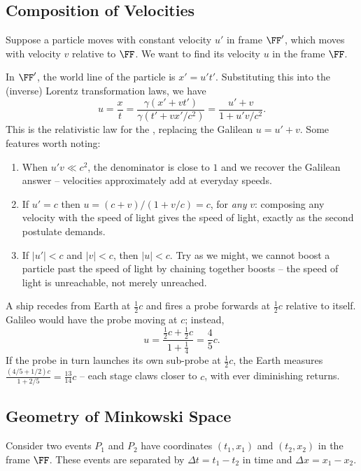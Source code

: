 \subsection{Composition of Velocities}

Suppose a particle moves with constant velocity $u'$ in frame $\FF'$, which moves with velocity $v$ relative to $\FF$. We want to find its velocity $u$ in the frame $\FF$.

In $\FF'$, the world line of the particle is $x' = u't'$. Substituting this into the (inverse) Lorentz transformation laws, we have
$$
u = \frac{x}{t} = \frac{\gamma(x' + vt')}{\gamma(t' + vx'/c^2)} = \frac{u' + v}{1 + u' v/c^2}.
$$
This is the relativistic law for the , replacing the Galilean $u = u' + v$. Some features worth noting:
\begin{enumerate}[label=(\roman*)]
	\item When $u'v \ll c^2$, the denominator is close to $1$ and we recover the Galilean answer -- velocities approximately add at everyday speeds.
	\item If $u' = c$ then $u = (c + v)/(1 + v/c) = c$, for \emph{any} $v$: composing any velocity with the speed of light gives the speed of light, exactly as the second postulate demands.
	\item If $|u'| < c$ and $|v| < c$, then $|u| < c$. Try as we might, we cannot boost a particle past the speed of light by chaining together boosts -- the speed of light is unreachable, not merely unreached.
\end{enumerate}

\begin{example}
	A ship recedes from Earth at $\frac{1}{2}c$ and fires a probe forwards at $\frac{1}{2}c$ relative to itself. Galileo would have the probe moving at $c$; instead,
	$$
	u = \frac{\frac{1}{2}c + \frac{1}{2}c}{1 + \frac{1}{4}} = \frac{4}{5}c.
	$$
	If the probe in turn launches its own sub-probe at $\frac{1}{2}c$, the Earth measures $\frac{(4/5 + 1/2)c}{1 + 2/5} = \frac{13}{14}c$ -- each stage claws closer to $c$, with ever diminishing returns.
\end{example}


\subsection{Geometry of Minkowski Space}

Consider two events $P_1$ and $P_2$ have coordinates $(t_1, x_1)$ and $(t_2, x_2)$ in the frame $\FF$. These events are separated by $\Delta t = t_1 - t_2$ in time and $\Delta x = x_1 - x_2$.


